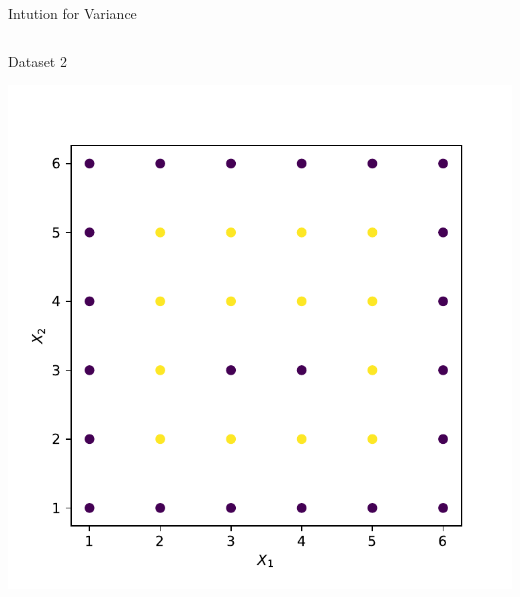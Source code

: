 \documentclass{beamer}
\begin{document}
\begin{frame}{Intution for Variance}
\begin{columns}
\begin{column}{0.5\textwidth}{\hspace{1.75cm} Dataset 2}
\begin{center}
\includegraphics[width = \textwidth]{../bias-variance/imgs/dataset-2-train-var}
\end{center}
\end{column}
\end{columns}
\end{frame}
\end{document}
